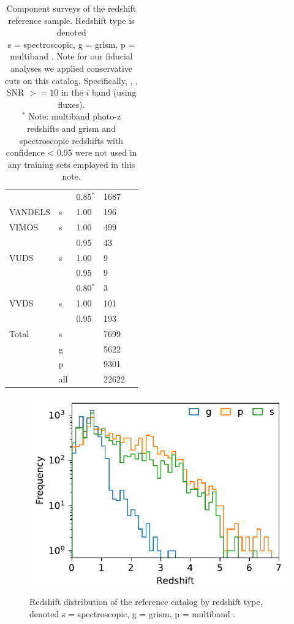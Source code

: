 \begin{table}[!p]
\begin{tabular}{lllll}
               &   & 0.85$^{*}$ & 1687 & \\
        VANDELS & s & 1.00 & 196 & \citet{garilli2021} \\
        VIMOS & s & 1.00 & 499 & \citet{balestra2010} \\
                  &   & 0.95 & 43 & \\
        VUDS & s & 1.00 & 9 & \citet{tasca2017} \\
             &   & 0.95 & 9 & \\
             &   & 0.80$^{*}$ & 3 & \\
        VVDS & s & 1.00 & 101 & \citet{lefevre2013} \\
             &   & 0.95 & 193 & \\
        \hline
        Total & s & & 7699 & \\
              & g & & 5622 & \\
              & p & & 9301 & \\
              & all & & 22622 & \\
        \hline
    \end{tabular}
    \caption{
        Component surveys of the redshift reference sample.
        Redshift type is denoted\\ s = spectroscopic, g = grism, p = multiband \photoz.
        Note for our fiducial analyses we applied conservative cuts on this catalog.
        Specifically, , , SNR $>= 10$ in the $i$ band (using  fluxes).\\
        $^{*}$ Note: multiband photo-z redshifts and grism and spectroscopic redshifts with confidence < 0.95 were not used in any training sets employed in this note.
    }
    \label{tab:reference-sample}
\end{table}

\begin{figure}
    \centering
    \includegraphics{figures/redshift_distribution_by_type.pdf}
    \caption{
        Redshift distribution of the reference catalog by redshift type, denoted s = spectroscopic, g = grism, p = multiband \photoz.
    }
    \label{fig:redshift-by-type}
\end{figure}

